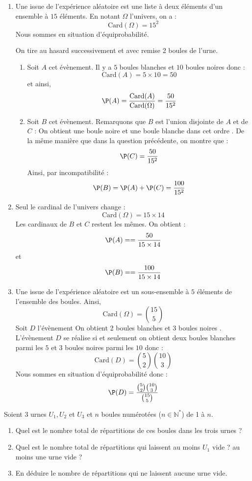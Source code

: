 \documentclass[a4paper,10pt]{report}
\begin{document}
\corr 

\begin{enumerate}
\item Une issue de l'expérience aléatoire est une liste à deux éléments d'un ensemble à $15$ éléments. En notant $\Omega$ l'univers, on a :
$$ \textrm{Card}(\Omega)= 15^2$$
Nous sommes en situation d'équiprobabilité.


On tire au hasard successivement et avec remise 2 boules de l'urne.
\begin{enumerate}
\item Soit $A$ cet évènement. Il y a $5$ boules blanches et $10$ boules noires donc :
$$ \textrm{Card}(A)= 5 \times 10 = 50$$
et ainsi,
$$ \P(A) = \dfrac{\textrm{Card}(A)}{\textrm{Card}(\Omega)} = \dfrac{50}{15^2}$$
\item Soit $B$ cet évènement. Remarquons que $B$ est l'union disjointe de $A$ et de $C$ : \og On obtient une boule noire et une boule blanche dans cet ordre \fg. De la même manière que dans la question précédente, on montre que :
$$ \P(C) = \dfrac{50}{15^2}$$
Ainsi, par incompatibilité :
$$ \P(B) = \P(A)+ \P(C) = \dfrac{100}{15^2}$$
\end{enumerate}
\item Seul le cardinal de l'univers change : 
$$ \textrm{Card}(\Omega)= 15 \times 14$$
Les cardinaux de $B$ et $C$ restent les mêmes. On obtient :
$$ \P(A) =  = \dfrac{50}{15 \times 14}$$
et 
$$ \P(B) =  = \dfrac{100}{15 \times 14}$$
\item Une issue de l'expérience aléatoire est un sous-ensemble à $5$ éléments de l'ensemble des boules. Ainsi,
$$ \textrm{Card}(\Omega)= \binom{15}{5} $$
Soit $D$ l'évènement \og On obtient 2 boules blanches et 3 boules noires \fg. L'évènement $D$ se réalise si et seulement on obtient deux boules blanches parmi les $5$ et $3$ boules noires parmi les $10$ donc :
$$ \textrm{Card}(D) = \binom{5}{2} \binom{10}{3}$$
Nous sommes en situation d'équiprobabilité donc :
$$ \P(D) = \dfrac{\binom{5}{2} \binom{10}{3}}{\binom{15}{5}}$$
\end{enumerate}

\begin{Exercice}{}Soient $3$ urnes $U_1,U_2$ et $U_3$ et $n$ boules numérotées ($n \in \mathbb{N}^*$) de 1 à $n$.
\begin{enumerate}
\item Quel est le nombre total de répartitions de ces boules dans les trois urnes ?
\item Quel est le nombre total de répartitions qui laissent au moins $U_1$ vide ? au moins une urne vide ?
\item En déduire le nombre de répartitions qui ne laissent aucune urne vide.
\end{enumerate}
\end{Exercice}
\end{document}
